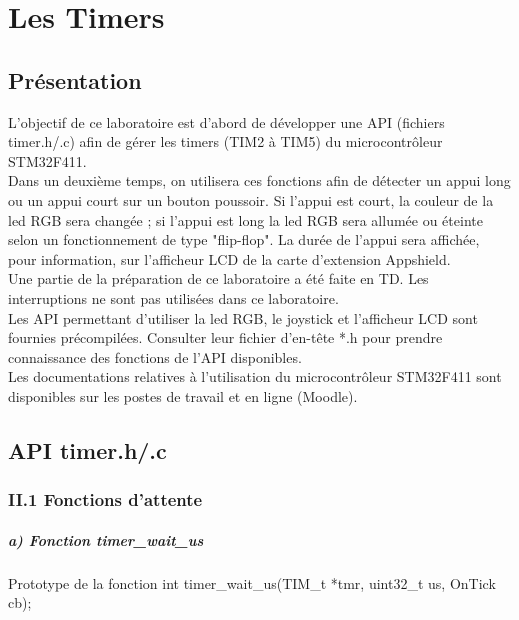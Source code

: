\part{Les Timers}
\chapter{Présentation}

L'objectif de ce laboratoire est d'abord de développer une API (fichiers timer.h/.c) afin de gérer les timers (TIM2 à TIM5) du microcontrôleur STM32F411.\\
Dans un deuxième temps, on utilisera ces fonctions afin de détecter un appui long ou un appui court sur un bouton poussoir. Si l'appui est court, la couleur de la led RGB sera changée ; si l'appui est long la led RGB sera allumée ou éteinte selon un fonctionnement de type "flip-flop". La durée de l'appui sera affichée, pour information, sur l'afficheur LCD de la carte d'extension Appshield. \\

Une partie de la préparation de ce laboratoire a été faite en TD. Les interruptions ne sont pas utilisées dans ce laboratoire. \\
Les API permettant d'utiliser la led RGB, le joystick et l'afficheur LCD sont fournies
précompilées. Consulter leur fichier d'en-tête *.h pour prendre connaissance des fonctions de l'API disponibles.\\
Les documentations relatives à l'utilisation du microcontrôleur STM32F411 sont disponibles
sur les postes de travail et en ligne (Moodle).



\chapter{API timer.h/.c}


\section{II.1 Fonctions d'attente}


\subsubsection{a) Fonction timer\_wait\_us}

\begin{Cpp}{Prototype de la fonction} 
int timer_wait_us(TIM_t *tmr, uint32_t us, OnTick cb);
\end{Cpp}

